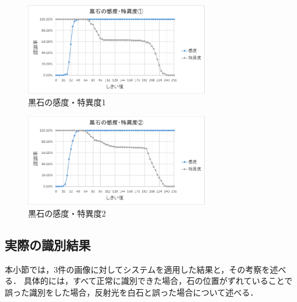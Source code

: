 \documentclass[openright]{nitocs}
\numberwithin{equation}{section}
\begin{document}
            \begin{figure}[tb] %
                \begin{center}
                \includegraphics[clip,width=80mm]{Case1_Black_TPF_TNF.eps} 
                \caption{黒石の感度・特異度1}
                \label{Case1Black}
                \end{center}
            \end{figure}

            \begin{figure}[tb] %
                \begin{center}
                \includegraphics[clip,width=80mm]{Case2_Black_TPF_TNF.eps} 
                \caption{黒石の感度・特異度2}
                \label{Case2Black}
                \end{center}
            \end{figure}

        \subsection{実際の識別結果} %
        \label{identify_result}
            本小節では，3件の画像に対してシステムを適用した結果と，その考察を述べる．
            具体的には，すべて正常に識別できた場合，石の位置がずれていることで誤った識別をした場合，反射光を白石と誤った場合について述べる．
\end{document}
